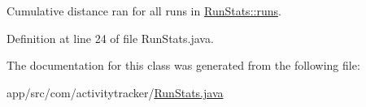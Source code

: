 Cumulative distance ran for all runs in \mbox{\hyperlink{classcom_1_1activitytracker_1_1_run_stats_a0fd429e9f463ddf4897c507c0e3c0a12}{Run\+Stats\+::runs}}. 

Definition at line 24 of file Run\+Stats.\+java.



The documentation for this class was generated from the following file\+:\begin{DoxyCompactItemize}
\item 
app/src/com/activitytracker/\mbox{\hyperlink{_run_stats_8java}{Run\+Stats.\+java}}\end{DoxyCompactItemize}
